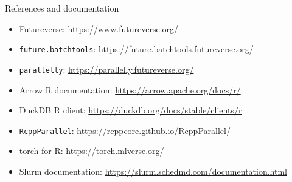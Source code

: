 \begin{frame}{References and documentation}
\scriptsize
\begin{itemize}
  \item Futureverse: \url{https://www.futureverse.org/}
  \item \texttt{future.batchtools}: \url{https://future.batchtools.futureverse.org/}
  \item \texttt{parallelly}: \url{https://parallelly.futureverse.org/}
  \item Arrow R documentation: \url{https://arrow.apache.org/docs/r/}
  \item DuckDB R client: \url{https://duckdb.org/docs/stable/clients/r}
  \item \texttt{RcppParallel}: \url{https://rcppcore.github.io/RcppParallel/}
  \item torch for R: \url{https://torch.mlverse.org/}
  \item Slurm documentation: \url{https://slurm.schedmd.com/documentation.html}
\end{itemize}


\end{frame}

